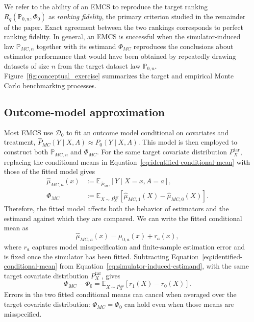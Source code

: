 We refer to the ability of an EMCS to reproduce the target ranking \(R_q(\mathbb P_{0,n},\Phi_0)\) as \emph{ranking fidelity}, the primary criterion studied in the remainder of the paper. Exact agreement between the two rankings corresponds to perfect ranking fidelity. In general, an EMCS is successful when the simulator-induced law \(\mathbb P_{MC,n}\) together with its estimand \(\Phi_{MC}\) reproduces the conclusions about estimator performance that would have been obtained by repeatedly drawing datasets of size \(n\) from the target dataset law \(\mathbb P_{0,n}\). Figure~\ref{fig:conceptual_exercise} summarizes the target and empirical Monte Carlo benchmarking processes.



\subsection{Outcome-model approximation}
\label{sec:outcome-model-approximation}

Most EMCS use \(\mathcal D_0\) to fit an outcome model conditional on covariates and treatment, \(\widehat P_{MC}(Y\mid X,A)\approx P_{0}(Y\mid X,A)\). This model is then employed to construct both \(\mathbb P_{MC,n}\) and \(\Phi_{MC}\). For the same target covariate distribution \(P_X^{\mathrm{tar}}\), replacing the conditional means in Equation~\eqref{eq:identified-conditional-mean} with those of the fitted model gives
\begin{equation}
\begin{aligned}
\widehat\mu_{MC,a}(x)
&:=\mathbb E_{\widehat P_{MC}}[Y\mid X=x,A=a],\\
\Phi_{MC}
&:=\mathbb E_{X\sim P_X^{\mathrm{tar}}}
\left[\widehat\mu_{MC,1}(X)-\widehat\mu_{MC,0}(X)\right].
\end{aligned}
\label{eq:simulator-induced-estimand}
\end{equation}
Therefore, the fitted model affects both the behavior of estimators and the estimand against which they are compared. We can write the fitted conditional mean as
\[
\widehat\mu_{MC,a}(x)=\mu_{0,a}(x)+r_a(x),
\]
where \(r_a\) captures model misspecification and finite-sample estimation error and is fixed once the simulator has been fitted. Subtracting Equation~\eqref{eq:identified-conditional-mean} from Equation~\eqref{eq:simulator-induced-estimand}, with the same target covariate distribution \(P_X^{\mathrm{tar}}\), gives
\begin{equation}
\Phi_{MC}-\Phi_0
=\mathbb E_{X\sim P_X^{\mathrm{tar}}}\left[r_1(X)-r_0(X)\right].
\label{eq:simulator-estimand-shift}
\end{equation}
Errors in the two fitted conditional means can cancel when averaged over the target covariate distribution: \(\Phi_{MC}=\Phi_0\) can hold even when those means are misspecified.

